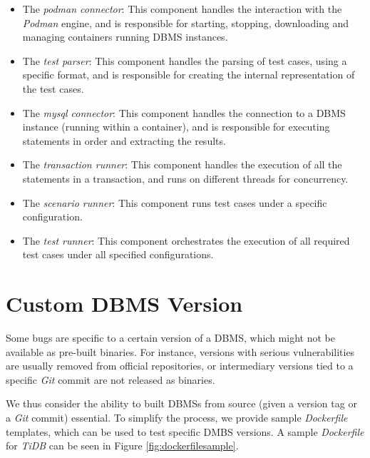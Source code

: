 \begin{itemize}
    \item The \textit{podman connector}: This component handles the interaction with the \textit{Podman} engine, and is responsible for starting, stopping, downloading and managing containers running DBMS instances.
    \item The \textit{test parser}: This component handles the parsing of test cases, using a specific format, and is responsible for creating the internal representation of the test cases.
    \item The \textit{mysql connector}: This component handles the connection to a DBMS instance (running within a container), and is responsible for executing statements in order and extracting the results.
    \item The \textit{transaction runner}: This component handles the execution of all the statements in a transaction, and runs on different threads for concurrency.
    \item The \textit{scenario runner}: This component runs test cases under a specific configuration.
    \item The \textit{test runner}: This component orchestrates the execution of all required test cases under all specified configurations. 
\end{itemize}

\section{Custom DBMS Version}

Some bugs are specific to a certain version of a DBMS, which might not be available as pre-built binaries. For instance, versions with serious vulnerabilities are usually removed from official repositories, or intermediary versions tied to a specific \textit{Git} commit are not released as binaries.

We thus consider the ability to built DBMSs from source (given a version tag or a \textit{Git} commit) essential. To simplify the process, we provide sample \textit{Dockerfile} templates, which can be used to test specific DMBS versions. A sample \textit{Dockerfile} for \textit{TiDB} can be seen in Figure \ref{fig:dockerfilesample}.
 
